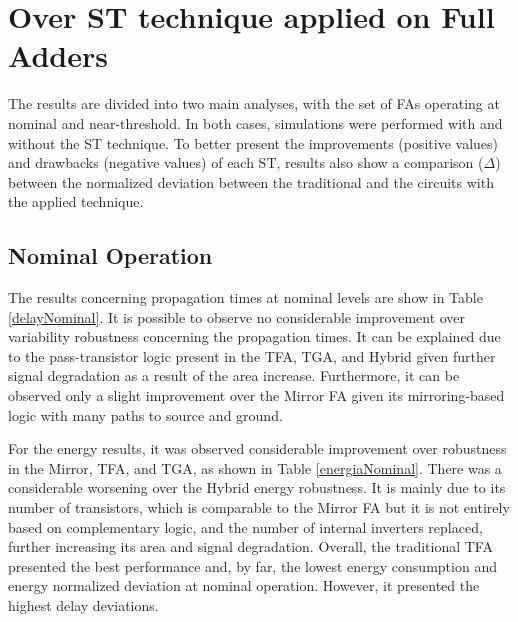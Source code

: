 \documentclass[pgmicro,mestrado,english]{iiufrgs}
\begin{document}
\section{Over ST technique applied on Full Adders}

The results are divided into two main analyses, with the set of FAs operating at nominal and near-threshold. In both cases, simulations were performed with and without the ST technique. To better present the improvements (positive values) and drawbacks (negative values) of each ST, results also show a comparison ($\Delta$) between the normalized deviation between the traditional and the circuits with the applied technique.

\subsection{Nominal Operation}

The results concerning propagation times at nominal levels are show in Table \ref{delayNominal}. It is possible to observe no considerable improvement over variability robustness concerning the propagation times. It can be explained due to the pass-transistor logic present in the TFA, TGA, and Hybrid given further signal degradation as a result of the area increase. Furthermore, it can be observed only a slight improvement over the Mirror FA given its mirroring-based logic with many paths to source and ground.

For the energy results, it was observed considerable improvement over robustness in the Mirror, TFA, and TGA, as shown in Table \ref{energiaNominal}. There was a considerable worsening over the Hybrid energy robustness. It is mainly due to its number of transistors, which is comparable to the Mirror FA but it is not entirely based on complementary logic, and the number of internal inverters replaced, further increasing its area and signal degradation. Overall, the traditional TFA presented the best performance and, by far, the lowest energy consumption and energy normalized deviation at nominal operation. However, it presented the highest delay deviations. 

\end{document}

